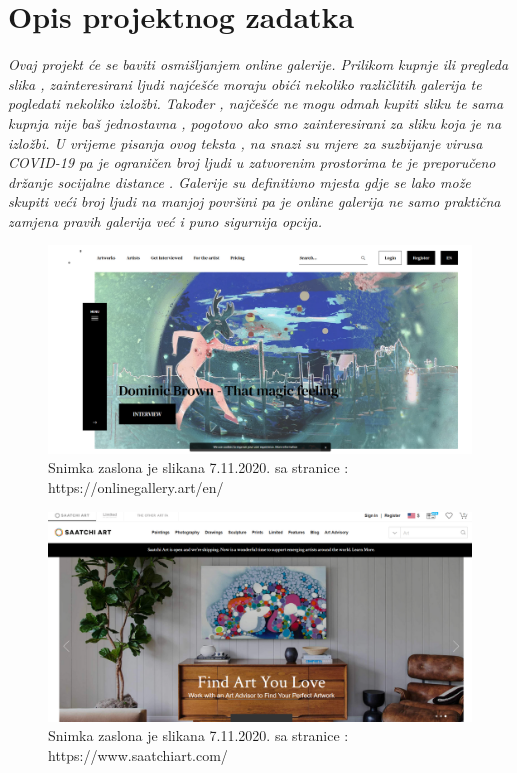 \chapter{Opis projektnog zadatka}
		
		\textit{Ovaj projekt će se baviti osmišljanjem online galerije. Prilikom kupnje ili pregleda slika , zainteresirani ljudi najćešće moraju obići nekoliko različlitih galerija te pogledati nekoliko  izložbi. Također , najčešće ne mogu odmah kupiti sliku te sama kupnja nije baš jednostavna , pogotovo ako smo zainteresirani za sliku koja je na izložbi. 
			 U vrijeme pisanja ovog  teksta , na snazi su mjere za suzbijanje virusa COVID-19 pa je ograničen broj ljudi u zatvorenim prostorima te je preporučeno držanje socijalne distance . Galerije su definitivno  mjesta gdje se lako može skupiti  veći broj ljudi na manjoj površini pa je online galerija ne samo praktična zamjena pravih galerija  već i puno sigurnija opcija. 	
		\vspace{10mm} 
}
		\graphicspath{ {./slike/} }
				\begin{figure}[H]

					\includegraphics[width=\textwidth,height=\textheight,keepaspectratio]{onlinegallery_art}
					\caption{\newline Snimka zaslona je slikana 7.11.2020. sa  stranice : https://onlinegallery.art/en/ }

				\end{figure}
		\graphicspath{ {./slike/} }
				\begin{figure}[H]

					\includegraphics[width=\textwidth,height=\textheight,keepaspectratio]{saatchiart_com}
					\caption{\newline Snimka zaslona je slikana 7.11.2020. sa  stranice : https://www.saatchiart.com/}

				\end{figure}	
		
